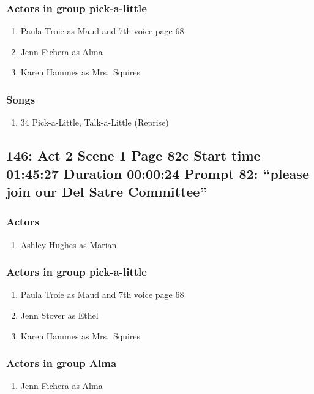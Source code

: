 \subsubsection{Actors in group pick-a-little}
\begin{enumerate}
\item Paula Troie as Maud and 7th voice page 68
\item Jenn Fichera as Alma
\item Karen Hammes as Mrs.~Squires
\end{enumerate}

\subsubsection{Songs}
\begin{enumerate}
\item 34 Pick-a-Little, Talk-a-Little (Reprise)
\end{enumerate}
\subsection{146: Act 2 Scene 1 Page 82c Start time 01:45:27 Duration 00:00:24 Prompt 82: ``please join our Del Satre Committee''}

\subsubsection{Actors}
\begin{enumerate}
\item Ashley Hughes as Marian
\end{enumerate}
\subsubsection{Actors in group pick-a-little}
\begin{enumerate}
\item Paula Troie as Maud and 7th voice page 68
\item Jenn Stover as Ethel
\item Karen Hammes as Mrs.~Squires
\end{enumerate}
\subsubsection{Actors in group Alma}
\begin{enumerate}
\item Jenn Fichera as Alma
\end{enumerate}

